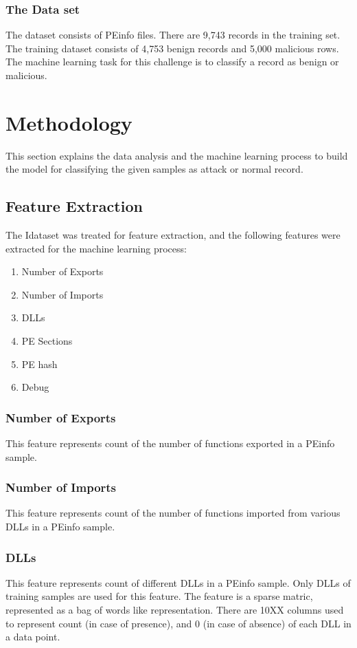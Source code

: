 \documentclass{llncs}
\begin{document}
\subsubsection{The Data set}
The dataset consists of PEinfo files. There are 9,743 records in the training set. The training dataset consists of 4,753 benign records and 5,000 malicious rows. The machine learning task for this challenge is to classify a record as benign or malicious.

\section{Methodology}
This section explains the data analysis and the machine learning process to build the model for classifying the given samples as attack  or normal record. 

\subsection{Feature Extraction}
The Idataset was treated for feature extraction, and the following features were extracted for the machine learning process:
\begin{enumerate}
	\item Number of Exports
	\item Number of Imports
	\item DLLs 
	\item PE Sections
	\item PE hash
	\item Debug
\end{enumerate}

\subsubsection{Number of Exports}
This feature represents count of the number of functions exported in a PEinfo sample. 

\subsubsection{Number of Imports}
This feature represents count of the number of functions imported from various DLLs in a PEinfo sample. 

\subsubsection{DLLs}
This feature represents count of different DLLs in a PEinfo sample. Only DLLs of training samples are used for this feature. The feature is a sparse matric, represented as a bag of words like representation. 
There are 10XX columns used to represent count (in case of presence), and 0 (in case of absence) of each DLL in a data point.
\end{document}
